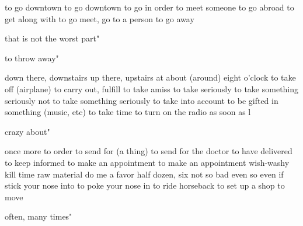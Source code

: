 {{{{{{  
{to go downtown}
{to go downtown}
{to go in order to meet someone}
{to go abroad}
{to get along with}
{to go meet, go to a person}
{to go away}
{that is not the worst part"

{to throw away"

{down there, downstairs}
{up there, upstairs}
{at about (around) eight o’clock}
{to take off (airplane)}
{to carry out, fulfill}
{to take amiss}
{to take seriously}
{to take something seriously}
{not to take something seriously}
{to take into account}
{to be gifted in something (music, etc)}
{to take time}
{to turn on the radio}
{as soon as l}
{crazy about"

{once more}
{to order}
{to send for (a thing)}
{to send for the doctor}
{to have delivered}
{to keep informed}
{to make an appointment}
{to make an appointment}
{wish-washy}
{kill time}
{raw material}
{do me a favor}
{half dozen, six}
{not so bad}
{even so}
{even if}
{stick your nose into}
{to poke your nose in}
{to ride horseback}
{to set up a shop}
{to move}
{often, many times"

}}}}}}}}}}
